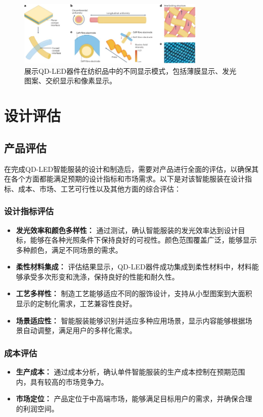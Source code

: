 \documentclass[12pt,hyperref,a4paper,UTF8]{ctexart}
\begin{document}
\begin{figure}[H]
  \centering
  \includegraphics[width=0.8\textwidth]{figures/fig/image14.png} 
  \caption{展示QD-LED器件在纺织品中的不同显示模式，包括薄膜显示、发光图案、交织显示和像素显示。\cite{wang2024towards}}
  \label{fig:display_modes}
\end{figure}

\newpage
\section{设计评估}

\subsection{产品评估}
在完成QD-LED智能服装的设计和制造后，需要对产品进行全面的评估，以确保其在各个方面都能满足预期的设计指标和市场需求。以下是对该智能服装在设计指标、成本、市场、工艺可行性以及其他方面的综合评估：

\subsubsection*{设计指标评估}
\begin{itemize}
  \item \textbf{发光效率和颜色多样性：} 通过测试，确认智能服装的发光效率达到设计目标，能够在各种光照条件下保持良好的可视性。颜色范围覆盖广泛，能够显示多种颜色，满足不同场景的需求。
  \item \textbf{柔性材料集成：} 评估结果显示，QD-LED器件成功集成到柔性材料中，材料能够承受多次形变和洗涤，保持良好的性能和耐久性。
  \item \textbf{工艺多样性：} 制造工艺能够适应不同的服饰设计，支持从小型图案到大面积显示的定制化需求，工艺兼容性良好。
  \item \textbf{场景适应性：} 智能服装能够识别并适应多种应用场景，显示内容能够根据场景自动调整，满足用户的多样化需求。
\end{itemize}

\subsubsection*{成本评估}
\begin{itemize}
  \item \textbf{生产成本：} 通过成本分析，确认单件智能服装的生产成本控制在预期范围内，具有较高的市场竞争力。
  \item \textbf{市场定位：} 产品定位于中高端市场，能够满足目标用户的需求，并确保合理的利润空间。
\end{itemize}
\end{document}
